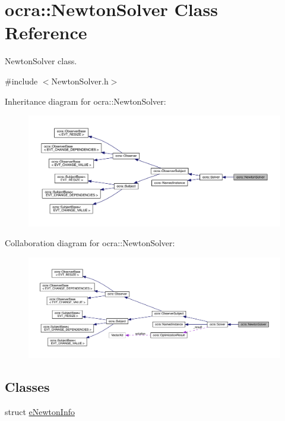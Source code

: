\hypertarget{classocra_1_1NewtonSolver}{}\section{ocra\+:\+:Newton\+Solver Class Reference}
\label{classocra_1_1NewtonSolver}


Newton\+Solver class.  




{\ttfamily \#include $<$Newton\+Solver.\+h$>$}



Inheritance diagram for ocra\+:\+:Newton\+Solver\+:\nopagebreak
\begin{figure}[H]
\begin{center}
\leavevmode
\includegraphics[width=350pt]{d6/d0b/classocra_1_1NewtonSolver__inherit__graph}
\end{center}
\end{figure}


Collaboration diagram for ocra\+:\+:Newton\+Solver\+:\nopagebreak
\begin{figure}[H]
\begin{center}
\leavevmode
\includegraphics[width=350pt]{d4/d73/classocra_1_1NewtonSolver__coll__graph}
\end{center}
\end{figure}
\subsection*{Classes}
\begin{DoxyCompactItemize}
\item 
struct \hyperlink{structocra_1_1NewtonSolver_1_1eNewtonInfo}{e\+Newton\+Info}
\end{DoxyCompactItemize}
